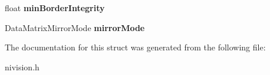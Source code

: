 \begin{DoxyCompactItemize}
\item 
\hypertarget{structDataMatrixDescriptionOptions__struct_a4f0661473641294b2054c1974f987d86}{
float {\bfseries minBorderIntegrity}}
\label{structDataMatrixDescriptionOptions__struct_a4f0661473641294b2054c1974f987d86}

\item 
\hypertarget{structDataMatrixDescriptionOptions__struct_ac76d416789e73635ff74d8fd09d3ca46}{
DataMatrixMirrorMode {\bfseries mirrorMode}}
\label{structDataMatrixDescriptionOptions__struct_ac76d416789e73635ff74d8fd09d3ca46}

\end{DoxyCompactItemize}


The documentation for this struct was generated from the following file:\begin{DoxyCompactItemize}
\item 
nivision.h\end{DoxyCompactItemize}

